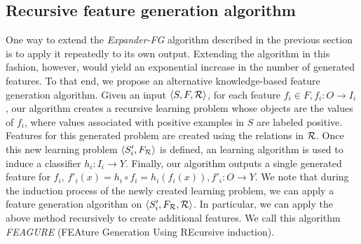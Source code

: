 \documentclass{article}
\theoremstyle{definition}
\begin{document}
\subsection{Recursive feature generation algorithm}
\label{algorithm_section}
One way to extend the \emph{Expander-FG} algorithm described in the previous section is to apply it repeatedly to its own output.
Extending the algorithm in this fashion, however, would yield an exponential increase in the number of generated features.
To that end, we propose an alternative knowledge-based feature generation algorithm. Given an input $\langle S,F,{\cal R} \rangle$, for each feature $f_i\in F, f_i:O\rightarrow I_i$, our algorithm creates a recursive learning problem whose objects are the values of $f_i$, where values associated with positive examples in $S$ are labeled positive. %
Features for this generated problem are created using the relations in ${\cal R}$. Once this new learning problem $\langle S'_i,F_{\cal R}\rangle$ is defined, an learning algorithm is used to induce a classifier $h_i:I_i\rightarrow Y$. Finally, our algorithm outputs a single generated feature for $f_i$, $f'_i(x)=h_i\circ f_i=h_i(f_i(x)), f'_i:O\rightarrow Y$.
We note that during the induction process of the newly created learning problem, we can apply a feature generation algorithm on $\langle S'_i,F_{\cal R},{\cal R} \rangle$. In particular, we can apply the above method recursively to create additional features. We call this algorithm \emph{FEAGURE} (FEAture Generation Using REcursive induction).

\end{document}
